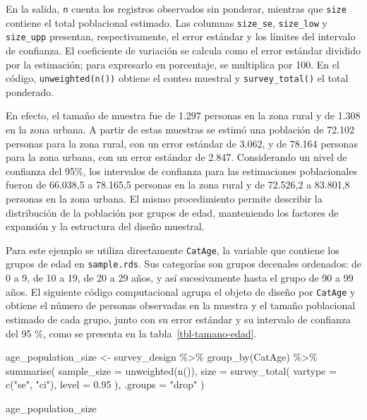 \documentclass[
  spanish,
  11pt,
  letterpaper,
  oneside,
  open=any]{scrbook}
\newenvironment{Shaded}{\begin{snugshade}}{\end{snugshade}}
\newcommand{\AttributeTok}[1]{\textcolor[rgb]{0.40,0.45,0.13}{#1}}
\newcommand{\FloatTok}[1]{\textcolor[rgb]{0.68,0.00,0.00}{#1}}
\newcommand{\FunctionTok}[1]{\textcolor[rgb]{0.28,0.35,0.67}{#1}}
\newcommand{\NormalTok}[1]{\textcolor[rgb]{0.00,0.23,0.31}{#1}}
\newcommand{\OtherTok}[1]{\textcolor[rgb]{0.00,0.23,0.31}{#1}}
\newcommand{\SpecialCharTok}[1]{\textcolor[rgb]{0.37,0.37,0.37}{#1}}
\newcommand{\StringTok}[1]{\textcolor[rgb]{0.13,0.47,0.30}{#1}}
\begin{document}
En la salida, \texttt{n} cuenta los registros observados sin ponderar,
mientras que \texttt{size} contiene el total poblacional estimado. Las
columnas \texttt{size\_se}, \texttt{size\_low} y \texttt{size\_upp}
presentan, respectivamente, el error estándar y los límites del
intervalo de confianza. El coeficiente de variación se calcula como el
error estándar dividido por la estimación; para expresarlo en
porcentaje, se multiplica por 100. En el código,
\texttt{unweighted(n())} obtiene el conteo muestral y
\texttt{survey\_total()} el total ponderado.

En efecto, el tamaño de muestra fue de 1.297 personas en la zona rural y
de 1.308 en la zona urbana. A partir de estas muestras se estimó una
población de 72.102 personas para la zona rural, con un error estándar
de 3.062, y de 78.164 personas para la zona urbana, con un error
estándar de 2.847. Considerando un nivel de confianza del 95\%, los
intervalos de confianza para las estimaciones poblacionales fueron de
66.038,5 a 78.165,5 personas en la zona rural y de 72.526,2 a 83.801,8
personas en la zona urbana. El mismo procedimiento permite describir la
distribución de la población por grupos de edad, manteniendo los
factores de expansión y la estructura del diseño muestral.

Para este ejemplo se utiliza directamente \texttt{CatAge}, la variable
que contiene los grupos de edad en \texttt{sample.rds}. Sus categorías
son grupos decenales ordenados: de 0 a 9, de 10 a 19, de 20 a 29 años, y
así sucesivamente hasta el grupo de 90 a 99 años. El siguiente código
computacional agrupa el objeto de diseño por \texttt{CatAge} y obtiene
el número de personas observadas en la muestra y el tamaño poblacional
estimado de cada grupo, junto con su error estándar y su intervalo de
confianza del 95 \%, como se presenta en la tabla~\ref{tbl-tamano-edad}.

\begin{Shaded}
\begin{Highlighting}[]
\NormalTok{age\_population\_size }\OtherTok{\textless{}{-}}\NormalTok{ survey\_design }\SpecialCharTok{\%\textgreater{}\%}
  \FunctionTok{group\_by}\NormalTok{(CatAge) }\SpecialCharTok{\%\textgreater{}\%}
  \FunctionTok{summarise}\NormalTok{(}
    \AttributeTok{sample\_size =} \FunctionTok{unweighted}\NormalTok{(}\FunctionTok{n}\NormalTok{()),}
    \AttributeTok{size =} \FunctionTok{survey\_total}\NormalTok{(}
      \AttributeTok{vartype =} \FunctionTok{c}\NormalTok{(}\StringTok{"se"}\NormalTok{, }\StringTok{"ci"}\NormalTok{),}
      \AttributeTok{level =} \FloatTok{0.95}
\NormalTok{    ),}
    \AttributeTok{.groups =} \StringTok{"drop"}
\NormalTok{  )}

\NormalTok{age\_population\_size}
\end{Highlighting}
\end{Shaded}
\end{document}
